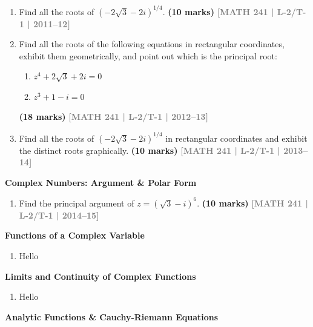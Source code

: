 \documentclass[12pt,a4paper]{article}
\newcommand{\yr}[1]{\hfill\textcolor{gray}{\small\textbf{[#1]}}}
\newcommand{\mk}[1]{\textcolor{orange!70!black}{\small\textbf{(#1 marks)}}}
\newcommand{\subtopic}[2]{%
  \vspace{10pt}
  \noindent\begin{tcolorbox}[colback=#1!8,colframe=#1,boxrule=0.6pt,arc=4pt,
    left=6pt,right=6pt,top=4pt,bottom=4pt]
    \small\bfseries\textcolor{#1}{#2}
  \end{tcolorbox}
  \vspace{2pt}
}
\begin{document}
\begin{enumerate}

\item Find all the roots of $(-2\sqrt{3}-2i)^{1/4}$.
\mk{10} \yr{MATH 241 | L-2/T-1 | 2011--12}

\item Find all the roots of the following equations in rectangular coordinates, exhibit them geometrically, and point out which is the principal root:
\begin{enumerate}
  \item $z^{4}+2\sqrt{3}+2i=0$
  \item $z^{3}+1-i=0$
\end{enumerate}
\mk{18} \yr{MATH 241 | L-2/T-1 | 2012--13}

\item Find all the roots of $(-2\sqrt{3}-2i)^{1/4}$ in rectangular coordinates and exhibit the distinct roots graphically.
\mk{10} \yr{MATH 241 | L-2/T-1 | 2013--14}

\end{enumerate}

\subtopic{cE}{Complex Numbers: Argument \& Polar Form}
\label{sub:s5-complexnums}

\begin{enumerate}

\item Find the principal argument of $z=(\sqrt{3}-i)^{6}$.
\mk{10} \yr{MATH 241 | L-2/T-1 | 2014--15}

\end{enumerate}

\subtopic{cE}{Functions of a Complex Variable}
\label{sub:s5-functions}

\begin{enumerate}
\item Hello \end{enumerate}

\subtopic{cE}{Limits and Continuity of Complex Functions}
\label{sub:s5-limcont}

\begin{enumerate}
\item Hello \end{enumerate}

\subtopic{cE}{Analytic Functions \& Cauchy-Riemann Equations}
\label{sub:s5-analytic}
\end{document}
